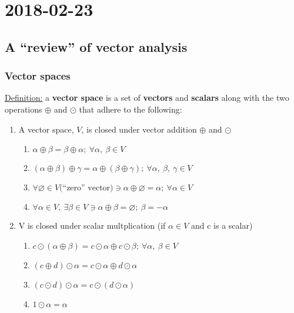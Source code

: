 \section{2018-02-23}

\subsection{A ``review'' of vector analysis}

\subsubsection{Vector spaces}

\underline{Definition:} a \textbf{vector space} is a set of \textbf{vectors} and \textbf{scalars} along with the two operations $\oplus$ and $\odot$ that adhere to the following:

\begin{enumerate}
  \item A vector space, $V$, is closed under vector addition $\oplus$ and $\odot$

  \begin{enumerate}
    \item $\alpha \oplus \beta = \beta \oplus \alpha;\ \forall \alpha,\ \beta \in V$
    \item $(\alpha \oplus \beta) \oplus \gamma = \alpha \oplus (\beta \oplus \gamma);\ \forall \alpha,\ \beta,\ \gamma \in V$
    \item $\forall \varnothing \in V \text{(``zero'' vector)} \ni \alpha \oplus \varnothing = \alpha;\ \forall \alpha \in V$
    \item $\forall \alpha \in V,\ \exists \beta \in V \ni \alpha \oplus \beta = \varnothing;\ \beta = -\alpha$
  \end{enumerate}

  \item V is closed under scalar multplication (if $\alpha \in V$ and c is a scalar)

  \begin{enumerate}
    \item $c \odot (\alpha \oplus \beta) = c \odot \alpha \oplus c \odot \beta;\ \forall \alpha,\ \beta \in V$
    \item $(c \oplus d) \odot \alpha = c\odot\alpha \oplus d\odot \alpha$
    \item $(c \odot d) \odot \alpha = c \odot (d \odot \alpha)$
    \item $1 \odot \alpha = \alpha$
  \end{enumerate}
\end{enumerate} 

